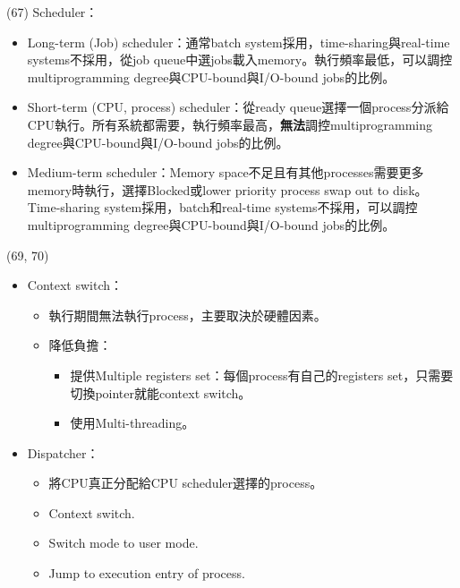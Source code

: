\begin{theorem}{(67)} Scheduler：\begin{itemize}
        \item Long-term (Job) scheduler：通常batch system採用，time-sharing與real-time systems不採用，從job queue中選jobs載入memory。執行頻率最低，可以調控multiprogramming degree與CPU-bound與I/O-bound jobs的比例。
        \item Short-term (CPU, process) scheduler：從ready queue選擇一個process分派給CPU執行。所有系統都需要，執行頻率最高，\textbf{無法}調控multiprogramming degree與CPU-bound與I/O-bound jobs的比例。
        \item Medium-term scheduler：Memory space不足且有其他processes需要更多memory時執行，選擇Blocked或lower priority process swap out to disk。Time-sharing system採用，batch和real-time systems不採用，可以調控multiprogramming degree與CPU-bound與I/O-bound jobs的比例。
    \end{itemize}
\end{theorem}

\begin{theorem}{(69, 70)} \quad\quad \begin{itemize}
        \item Context switch：\begin{itemize}
            \item 執行期間無法執行process，主要取決於硬體因素。
            \item 降低負擔：\begin{itemize}
                \item 提供Multiple registers set：每個process有自己的registers set，只需要切換pointer就能context switch。
                \item 使用Multi-threading。
            \end{itemize}
        \end{itemize}
        \item Dispatcher：\begin{itemize}
            \item 將CPU真正分配給CPU scheduler選擇的process。
            \item Context switch.
            \item Switch mode to user mode.
            \item Jump to execution entry of process.
        \end{itemize}
    \end{itemize}
\end{theorem}

